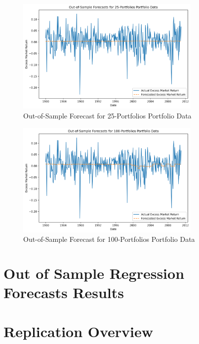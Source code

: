 \documentclass[12pt]{article}
\begin{document}
\begin{figure}[h]
    \centering
    \includegraphics[width=0.8\textwidth]{plots/Out_of_Sample_Forecasts_for_25_Portfolios_Portfolio_Data.png}
    \caption{Out-of-Sample Forecast for 25-Portfolios Portfolio Data}
    \label{fig:forecast_chart}
\end{figure}

\begin{figure}[h]
    \centering
    \includegraphics[width=0.8\textwidth]{plots/Out_of_Sample_Forecasts_for_100_Portfolios_Portfolio_Data.png}
    \caption{Out-of-Sample Forecast for 100-Portfolios Portfolio Data}
    \label{fig:forecast_chart}
\end{figure}


\doublespacing
\section{Out of Sample Regression Forecasts Results}




\doublespacing
\section{Replication Overview}
\end{document}
